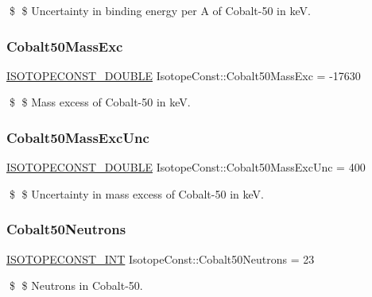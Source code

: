 \$ \$ Uncertainty in binding energy per A of Cobalt-\/50 in keV. \mbox{\label{group___isotope_const-_cobalt-_co50_ga1a9a301042c86c919439dfce19cd96c4}} 
\subsubsection{\texorpdfstring{Cobalt50\+Mass\+Exc}{Cobalt50MassExc}}
{\footnotesize\ttfamily \mbox{\hyperlink{group___isotope_const-_macros_ga8f45a7272ce02c0b4c65c44636ed719a}{I\+S\+O\+T\+O\+P\+E\+C\+O\+N\+S\+T\+\_\+\+D\+O\+U\+B\+LE}} Isotope\+Const\+::\+Cobalt50\+Mass\+Exc = -\/17630}

\$ \$ Mass excess of Cobalt-\/50 in keV. \mbox{\label{group___isotope_const-_cobalt-_co50_gac68c57a8fa77faadd4525e94865b29a4}} 
\subsubsection{\texorpdfstring{Cobalt50\+Mass\+Exc\+Unc}{Cobalt50MassExcUnc}}
{\footnotesize\ttfamily \mbox{\hyperlink{group___isotope_const-_macros_ga8f45a7272ce02c0b4c65c44636ed719a}{I\+S\+O\+T\+O\+P\+E\+C\+O\+N\+S\+T\+\_\+\+D\+O\+U\+B\+LE}} Isotope\+Const\+::\+Cobalt50\+Mass\+Exc\+Unc = 400}

\$ \$ Uncertainty in mass excess of Cobalt-\/50 in keV. \mbox{\label{group___isotope_const-_cobalt-_co50_ga7ff43c7eaa031dd02f128d9df421dc26}} 
\subsubsection{\texorpdfstring{Cobalt50\+Neutrons}{Cobalt50Neutrons}}
{\footnotesize\ttfamily \mbox{\hyperlink{group___isotope_const-_macros_ga5f18360b3e99483a35c32d789e62621c}{I\+S\+O\+T\+O\+P\+E\+C\+O\+N\+S\+T\+\_\+\+I\+NT}} Isotope\+Const\+::\+Cobalt50\+Neutrons = 23}

\$ \$ Neutrons in Cobalt-\/50. \mbox{\label{group___isotope_const-_cobalt-_co50_ga1465bcb3e837b40e6bc72509ea151f58}} 
